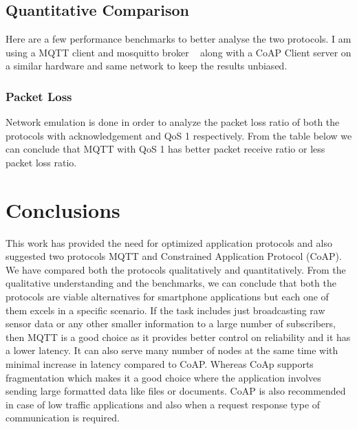 \documentclass[conference]{IEEEtran}
\begin{document}
\subsection{Quantitative Comparison}
Here are a few performance benchmarks to better analyse the two protocols. I am using a MQTT client and mosquitto broker ~\cite{mosquitto} along with a CoAP Client server on a similar hardware and same network to keep the results unbiased. 



\subsubsection{Packet Loss}
Network emulation is done in order to analyze the packet loss ratio of both the protocols with acknowledgement and QoS 1 respectively.
From the table below we can conclude that MQTT with QoS 1 has better packet receive ratio or less packet loss ratio.


\begin{table}[h!]
  \centering
  \caption{Avg Packet Received Ratio}
  \label{tab:label_test}
\end{table}


\section{Conclusions}
This work has provided the need for optimized application protocols and also suggested two protocols MQTT and Constrained Application Protocol (CoAP). We have compared both the protocols qualitatively and quantitatively. From the qualitative understanding and the benchmarks, we can conclude that both the protocols are viable alternatives for smartphone applications but each one of them excels in a specific scenario. If the task includes just broadcasting raw sensor data or any other smaller information to a large number of subscribers, then MQTT is a good choice as it provides better control on reliability and it has a lower latency. It can also serve many number of nodes at the same time with minimal increase in latency compared to CoAP. Whereas CoAp supports fragmentation which makes it a good choice where the application involves sending large formatted data like files or documents. CoAP is also recommended in case of low traffic applications and also when a request response type of communication is required.
\end{document}
